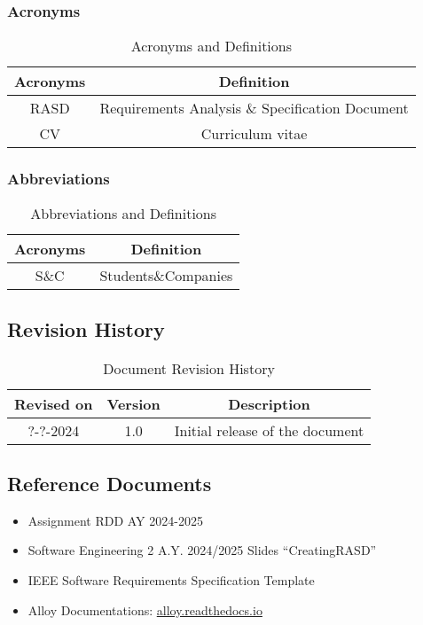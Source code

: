 \subsubsection{Acronyms}
\begin{table}[h]
    \centering
\begin{tabular}{|c|c|}
        \hline
        \textbf{Acronyms} & \textbf{Definition} \\ \hline
        RASD & Requirements Analysis \& Specification Document\\ \hline
        CV & Curriculum vitae\\ \hline
    \end{tabular}
    \caption{Acronyms and Definitions}
    \label{tab:acronyms}
\end{table}

\subsubsection{Abbreviations}
\begin{table}[h]
    \centering
\begin{tabular}{|c|c|}
        \hline
        \textbf{Acronyms} & \textbf{Definition} \\ \hline
        S\&C & Students\&Companies \\ \hline
    \end{tabular}
    \caption{Abbreviations and Definitions}
    \label{tab:abbreviations}
\end{table}

\subsection{Revision History}
\begin{table}[h]
    \centering
    \begin{tabular}{|c|c|c|}
        \hline
        \textbf{Revised on} & \textbf{Version} & \textbf{Description}\\ \hline
        ?-?-2024 & 1.0     & Initial release of the document \\ \hline
    \end{tabular}
    \caption{Document Revision History}
    \label{tab:revision_history_table}
\end{table}

\subsection{Reference Documents}
\begin{itemize}
  \item Assignment RDD AY 2024-2025
  \item Software Engineering 2 A.Y. 2024/2025 Slides “CreatingRASD”
  \item IEEE Software Requirements Specification Template
  \item Alloy Documentations: \url{alloy.readthedocs.io}
\end{itemize}


